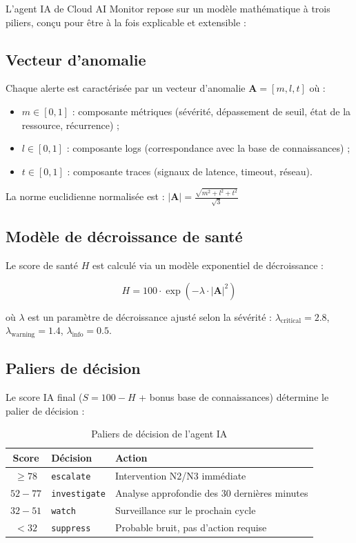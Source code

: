 \documentclass[11pt,a4paper]{report}
\begin{document}
L'agent IA de Cloud AI Monitor repose sur un modèle mathématique à trois
piliers, conçu pour être à la fois explicable et extensible :

\subsection{Vecteur d'anomalie}

Chaque alerte est caractérisée par un vecteur d'anomalie
$\mathbf{A} = [m, l, t]$ où :
\begin{itemize}[label=\textbullet, leftmargin=1.5cm, labelsep=0.5cm,
                itemsep=0.1em, parsep=0em, topsep=0.2em]
    \item $m \in [0, 1]$ : composante métriques (sévérité, dépassement de
    seuil, état de la ressource, récurrence) ;
    \item $l \in [0, 1]$ : composante logs (correspondance avec la base de
    connaissances) ;
    \item $t \in [0, 1]$ : composante traces (signaux de latence, timeout,
    réseau).
\end{itemize}

La norme euclidienne normalisée est :
$|\mathbf{A}| = \frac{\sqrt{m^2 + l^2 + t^2}}{\sqrt{3}}$

\subsection{Modèle de décroissance de santé}

Le score de santé $H$ est calculé via un modèle exponentiel de décroissance :

$$H = 100 \cdot \exp\left(-\lambda \cdot |\mathbf{A}|^2\right)$$

où $\lambda$ est un paramètre de décroissance ajusté selon la sévérité :
$\lambda_{\text{critical}} = 2.8$, $\lambda_{\text{warning}} = 1.4$,
$\lambda_{\text{info}} = 0.5$.

\subsection{Paliers de décision}

Le score IA final ($S = 100 - H$ + bonus base de connaissances) détermine
le palier de décision :

\begin{table}[H]
\centering
\renewcommand{\arraystretch}{1.3}
\begin{tabular}{|c|l|p{7.5cm}|}
\hline
\textbf{Score} & \textbf{Décision} & \textbf{Action} \\
\hline
$\geq 78$ & \texttt{escalate} & Intervention N2/N3 immédiate \\
\hline
$52 - 77$ & \texttt{investigate} & Analyse approfondie des 30 dernières minutes \\
\hline
$32 - 51$ & \texttt{watch} & Surveillance sur le prochain cycle \\
\hline
$< 32$ & \texttt{suppress} & Probable bruit, pas d'action requise \\
\hline
\end{tabular}
\caption{Paliers de décision de l'agent IA}
\end{table}
\end{document}
